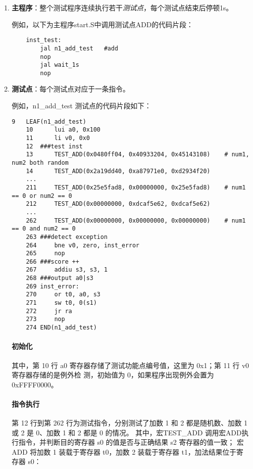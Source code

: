 \begin{enumerate}
    \item {\bf 主程序}：整个测试程序连续执行若干\emph{测试点}，每个测试点结束后停顿1s。

    例如，以下为主程序start.S中调用测试点ADD的代码片段：

    \begin{lstlisting}
    inst_test:
        jal n1_add_test   #add
        nop
        jal wait_1s
        nop
    \end{lstlisting}

    \item {\bf 测试点}：每个测试点对应于一条指令。

    例如，n1\_add\_test 测试点的代码片段如下：

    \begin{lstlisting}[emph={TEST\_ADD}, caption={inst/n1\_add.S}]
    9   LEAF(n1_add_test)
	10      lui a0, 0x100
	11      li v0, 0x0
	12  ###test inst
	13    	TEST_ADD(0x0480ff04, 0x40933204, 0x45143108)    # num1, num2 both random
	14      TEST_ADD(0x2a19dd40, 0xa87971e0, 0xd2934f20)
    ...
	211     TEST_ADD(0x25e5fad8, 0x00000000, 0x25e5fad8)    # num1 == 0 or num2 == 0
	212     TEST_ADD(0x00000000, 0xdcaf5e62, 0xdcaf5e62)
    ...
	262     TEST_ADD(0x00000000, 0x00000000, 0x00000000)    # num1 == 0 and num2 == 0
	263 ###detect exception
	264     bne v0, zero, inst_error
	265     nop
	266 ###score ++
	267     addiu s3, s3, 1
	268 ###output a0|s3
	269 inst_error:
	270     or t0, a0, s3
	271     sw t0, 0(s1)
	272     jr ra
	273     nop
	274 END(n1_add_test)
    \end{lstlisting}

    \paragraph{初始化}
    其中，第 10 行 a0 寄存器存储了测试功能点编号值，这里为 0x1；第 11 行 v0 寄存器存储的是例外检
    测，初始值为 0，如果程序出现例外会置为 0xFFFF0000。

    \paragraph{指令执行}
    第 12 行到第 262 行为测试指令，分别测试了加数 1 和 2 都是随机数、加数 1 或 2 是 0、加数 1 和 2 都是 0 的情况。
    其中，宏TEST\_ADD 调用宏ADD执行指令，并判断目的寄存器 s0 的值是否与正确结果 s2 寄存器的值一致；
    宏ADD 将加数 1 装载于寄存器 t0，加数 2 装载于寄存器 t1，加法结果位于寄存器 s0：


\end{enumerate}
